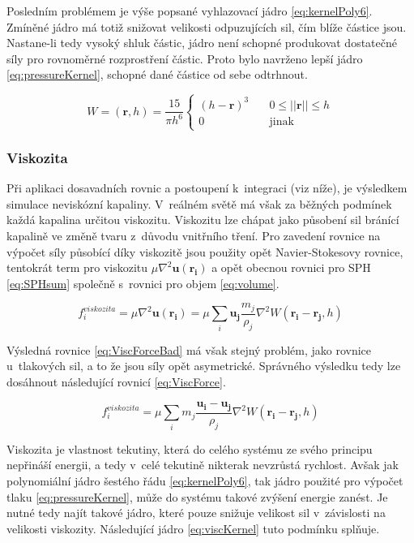 Posledním problémem je výše popsané vyhlazovací jádro \ref{eq:kernelPoly6}. Zmíněné jádro má totiž snižovat velikosti odpuzujících sil, čím blíže částice jsou. Nastane-li tedy vysoký shluk částic, jádro není schopné produkovat dostatečné síly pro rovnoměrné rozprostření částic. Proto bylo navrženo \cite{Desbrun96} lepší jádro \ref{eq:pressureKernel}, schopné dané částice od sebe odtrhnout.

\begin{equation}
	W = (\mathbf{r}, h) = \frac{15}{\pi h^6}
	\begin{cases}
		(h - \mathbf{r})^3 & \quad 0 \leq ||\mathbf{r}|| \leq h \\
		0                  & \quad \text{jinak}
	\end{cases}
	\label{eq:pressureKernel}
\end{equation}

\subsubsection{Viskozita}
Při aplikaci dosavadních rovnic a postoupení k~integraci (viz níže), je výsledkem simulace neviskózní kapaliny. V~reálném světě má však za běžných podmínek každá kapalina určitou viskozitu. Viskozitu lze chápat jako působení sil bránící kapalině ve změně tvaru z~důvodu vnitřního tření. Pro zavedení rovnice na výpočet síly působící díky viskozitě jsou použity opět Navier-Stokesovy rovnice, tentokrát term pro viskozitu $\mu \nabla^2\mathbf{u}(\mathbf{r_i})$ a opět obecnou rovnici pro SPH \ref{eq:SPHsum} společně s~rovnici pro objem \ref{eq:volume}.

\begin{equation}
	f^{viskozita}_i = \mu \nabla^2\mathbf{u}(\mathbf{r_i}) = \mu \sum_i \mathbf{u_j} \frac{m_j}{\rho_j} \nabla^2 W(\mathbf{r_i} - \mathbf{r_j},h)
	\label{eq:ViscForceBad}
\end{equation}

Výsledná rovnice \ref{eq:ViscForceBad} má však stejný problém, jako rovnice u~tlakových sil, a to že jsou síly opět asymetrické. Správného výsledku tedy lze dosáhnout následující rovnicí \ref{eq:ViscForce}. \cite{Muller03}

\begin{equation}
	f^{viskozita}_i = \mu \sum_i m_j \frac{\mathbf{u_i} - \mathbf{u_j}}{\rho_j} \nabla^2 W(\mathbf{r_i} - \mathbf{r_j},h)
	\label{eq:ViscForce}
\end{equation}

Viskozita je vlastnost tekutiny, která do celého systému ze svého principu nepřináší energii, a tedy v~celé tekutině nikterak nevzrůstá rychlost. Avšak jak polynomiální jádro šestého řádu \ref{eq:kernelPoly6}, tak jádro použité pro výpočet tlaku \ref{eq:pressureKernel}, může do systému takové zvýšení energie zanést. Je nutné tedy najít takové jádro, které pouze snižuje velikost sil v~závislosti na velikosti viskozity. Následující jádro \ref{eq:viscKernel} tuto podmínku splňuje. \cite{Muller03}

